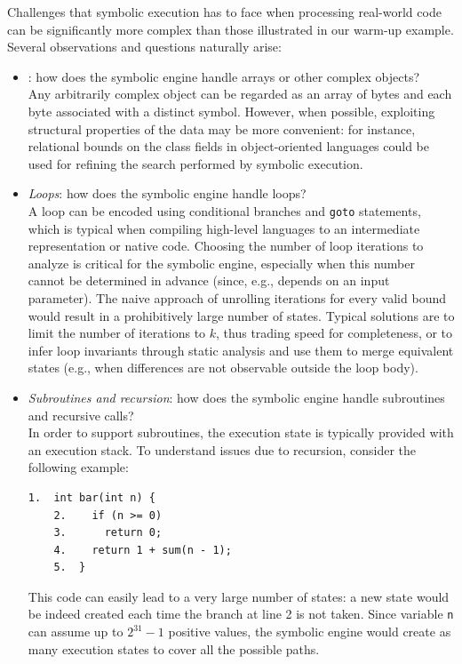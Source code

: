Challenges that symbolic execution has to face when processing real-world code can be significantly more complex than those illustrated in our warm-up example. Several observations and questions naturally arise:

\begin{itemize}

\item {}: how does the symbolic engine handle arrays or other complex objects? \\
Any arbitrarily complex object can be regarded as an array of bytes and each byte associated with a distinct symbol. However, when possible, exploiting structural properties of the data may be more convenient: for instance, relational bounds on the class fields in object-oriented languages could be used for refining the search performed by symbolic execution.
\vspace{1mm}

  \item {\em Loops}: how does the symbolic engine handle loops? \\
A loop can be encoded using conditional branches and {\tt goto} statements, which is typical  when compiling high-level languages to an intermediate representation or native code. Choosing the number of loop iterations to analyze is critical for the symbolic engine, especially when this number cannot be determined in advance (since, e.g., depends on an input parameter). The naive approach of unrolling iterations for every valid bound would result in a prohibitively large number of states. Typical solutions are to limit the number of iterations to $k$, thus trading speed for completeness, or to infer loop invariants through static analysis  and use them to merge equivalent states (e.g., when differences are not observable outside the loop body).
\vspace{1mm}

  \item {\em Subroutines and recursion}: how does the symbolic engine handle subroutines and recursive calls? \\
In order to support subroutines, the execution state is typically provided with an execution stack. To understand issues due to recursion, consider the following example:
    \begin{lstlisting}[basicstyle=\ttfamily\small]
    1.  int bar(int n) {
    2.    if (n >= 0) 
    3.      return 0;
    4.    return 1 + sum(n - 1);
    5.  }
    \end{lstlisting}
This code can easily lead to a very large number of states: a new state would be indeed created each time the branch at line 2 is not taken. Since variable {\tt n} can assume up to  $2^{31} - 1$ positive values, the symbolic engine would create as many execution states to cover all the possible paths.
 \vspace{1mm}


\end{itemize}
